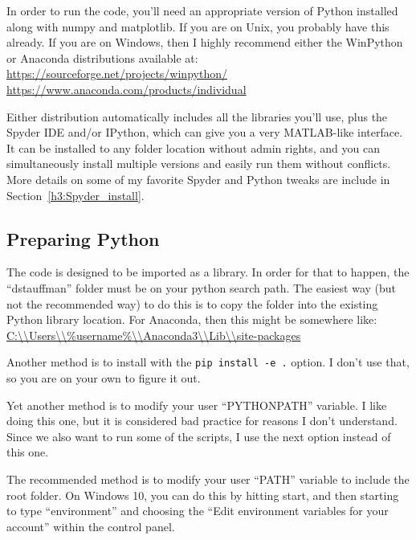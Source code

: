 \documentclass[12pt]{article}
\begin{document}
In order to run the code, you'll need an appropriate version of Python installed along with numpy and matplotlib.  If you are on Unix, you probably have this already.  If you are on Windows, then I highly recommend either the WinPython or Anaconda distributions available at:
\newline\url{https://sourceforge.net/projects/winpython/}
\newline\url{https://www.anaconda.com/products/individual}

Either distribution automatically includes all the libraries you'll use, plus the Spyder IDE and/or IPython, which can give you a very MATLAB-like interface.  It can be installed to any folder location without admin rights, and you can simultaneously install multiple versions and easily run them without conflicts.  More details on some of my favorite Spyder and Python tweaks are include in Section~\ref{h3:Spyder_install}.

\subsection{Preparing Python}\label{h2:Preparing_python}
The code is designed to be imported as a library.  In order for that to happen, the ``dstauffman'' folder must be on your python search path.  The easiest way (but not the recommended way) to do this is to copy the folder into the existing Python library location.  For Anaconda, then this might be somewhere like:
\newline\url{C:\\Users\\\%username\%\\Anaconda3\\Lib\\site-packages}

Another method is to install with the \texttt{pip install -e .} option.  I don't use that, so you are on your own to figure it out.

Yet another method is to modify your user ``PYTHONPATH'' variable.  I like doing this one, but it is considered bad practice for reasons I don't understand.  Since we also want to run some of the scripts, I use the next option instead of this one.

The recommended method is to modify your user ``PATH'' variable to include the root folder.  On Windows 10, you can do this by hitting start, and then starting to type ``environment'' and choosing the ``Edit environment variables for your account'' within the control panel.
\end{document}
